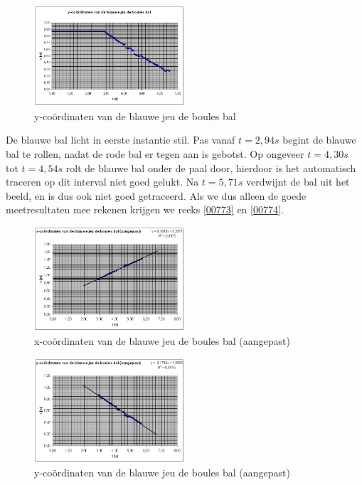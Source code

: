 \documentclass[12pt,a4paper]{article}
\begin{document}
	\begin{figure}[H]
		\centerline{\includegraphics[width=0.5\textwidth]{Plaatjes/00772.png}}
		\caption{y-co\"{o}rdinaten van de blauwe jeu de boules bal}
		\label{00772}
	\end{figure}

	De blauwe bal licht in eerste instantie stil. Pas vanaf $t=2,94s$ begint de blauwe bal te rollen, nadat de rode bal er tegen aan is gebotst. Op ongeveer $t=4,30s$ tot $t=4,54s$ rolt de blauwe bal onder de paal door, hierdoor is het automatisch traceren op dit interval niet goed gelukt. Na $t=5,71s$ verdwijnt de bal uit het beeld, en is dus ook niet goed getraceerd. Als we dus alleen de goede meetresultaten mee rekenen krijgen we reeks \eqref{00773} en \eqref{00774}.

	\begin{figure}[H]
		\centerline{\includegraphics[width=0.5\textwidth]{Plaatjes/00773.png}}
		\caption{x-co\"{o}rdinaten van de blauwe jeu de boules bal (aangepast)}
		\label{00773}
	\end{figure}
	
	\begin{figure}[H]
		\centerline{\includegraphics[width=0.5\textwidth]{Plaatjes/00774.png}}
		\caption{y-co\"{o}rdinaten van de blauwe jeu de boules bal (aangepast)}
		\label{00774}
	\end{figure}
\end{document}
